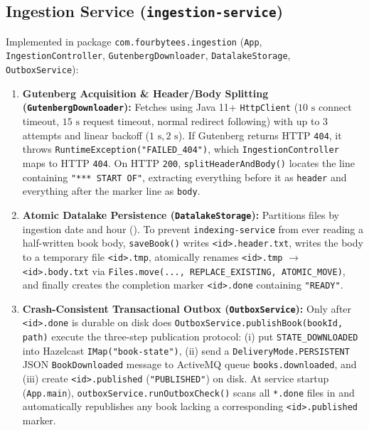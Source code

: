 \documentclass[10pt,a4paper]{article}
\begin{document}
\subsection{Ingestion Service (\texttt{ingestion-service})}
Implemented in package \texttt{com.fourbytees.ingestion} (\texttt{App}, \texttt{IngestionController}, \texttt{GutenbergDownloader}, \texttt{DatalakeStorage}, \texttt{OutboxService}):
\begin{enumerate}[leftmargin=*,nosep]
    \item \textbf{Gutenberg Acquisition \& Header/Body Splitting (\texttt{GutenbergDownloader}):} Fetches  using Java 11+ \texttt{HttpClient} ($10\text{ s}$ connect timeout, $15\text{ s}$ request timeout, normal redirect following) with up to $3$ attempts and linear backoff ($1\text{ s}, 2\text{ s}$). If Gutenberg returns HTTP \texttt{404}, it throws \texttt{RuntimeException("FAILED\_404")}, which \texttt{IngestionController} maps to HTTP \texttt{404}. On HTTP \texttt{200}, \texttt{splitHeaderAndBody()} locates the line containing \texttt{"*** START OF"}, extracting everything before it as \texttt{header} and everything after the marker line as \texttt{body}.
    \item \textbf{Atomic Datalake Persistence (\texttt{DatalakeStorage}):} Partitions files by ingestion date and hour (). To prevent \texttt{indexing-service} from ever reading a half-written book body, \texttt{saveBook()} writes \texttt{<id>.header.txt}, writes the body to a temporary file \texttt{<id>.tmp}, atomically renames \texttt{<id>.tmp} $\to$ \texttt{<id>.body.txt} via \texttt{Files.move(..., REPLACE\_EXISTING, ATOMIC\_MOVE)}, and finally creates the completion marker \texttt{<id>.done} containing \texttt{"READY"}.
    \item \textbf{Crash-Consistent Transactional Outbox (\texttt{OutboxService}):} Only after \texttt{<id>.done} is durable on disk does \texttt{OutboxService.publishBook(bookId, path)} execute the three-step publication protocol: (i) put \texttt{STATE\_DOWNLOADED} into Hazelcast \texttt{IMap("book-state")}, (ii) send a \texttt{DeliveryMode.PERSISTENT} JSON \texttt{BookDownloaded} message to ActiveMQ queue \texttt{books.downloaded}, and (iii) create \texttt{<id>.published} (\texttt{"PUBLISHED"}) on disk. At service startup (\texttt{App.main}), \texttt{outboxService.runOutboxCheck()} scans all \texttt{*.done} files in  and automatically republishes any book lacking a corresponding \texttt{<id>.published} marker.
\end{enumerate}
\end{document}
